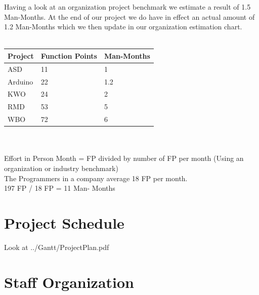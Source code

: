 \documentclass[
	11pt,
	a4paper
]{article}%
\begin{document}
Having a look at an organization project benchmark we estimate a result of 1.5 Man-Months. At the end of our project we do have in effect an actual amount of 1.2 Man-Months which we then update in our organization estimation chart.\\\\
\begin{tabular}{|l|l|l|}
\hline
    \rowcolor{dunkelgrau}
	Project & Function Points 	& Man-Months 	\\ \hline
	ASD 	& 11 				& 1				\\ \hline
	Arduino	& 22				& 1.2			\\ \hline
	KWO 	& 24 				& 2				\\ \hline
	RMD 	& 53 				& 5				\\ \hline
	WBO 	& 72 				& 6				\\ \hline
\end{tabular}\\\\
Effort in Person Month = FP divided by number of FP per month (Using an organization or industry benchmark)\\
The Programmers in a company average 18 FP per month.\\
197 FP / 18 FP = 11 Man- Months


\section{Project Schedule}
Look at ../Gantt/ProjectPlan.pdf

\section{Staff Organization}
\end{document}
